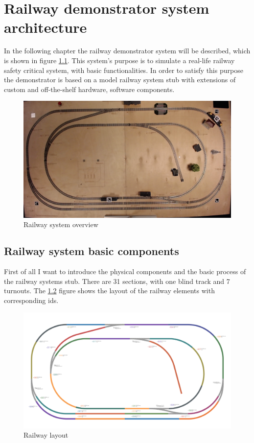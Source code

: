 
\chapter{Railway demonstrator system architecture}
In the following chapter the railway demonstrator system will be described, which is shown in figure \ref{fig:overview}. This system's purpose is to simulate a real-life railway safety critical system, with basic functionalities. In order to satisfy this purpose the demonstrator is based on a model railway system stub with extensions of custom and off-the-shelf hardware, software components. 
\begin{figure}[!ht]
	\centering
	\includegraphics[width=150mm]{figures/modes3/overview.jpg}
	\caption{Railway system overview}
	\label{fig:overview}
\end{figure}
\section{Railway system basic components}
First of all I want to introduce the physical components and the basic process of the railway systems stub. There are 31 sections, with one blind track and 7 turnouts. The \ref{fig:layout} figure shows the layout of the railway elements with corresponding ids.
\begin{figure}[!ht]
	\centering
	\includegraphics[width=150mm, keepaspectratio]{figures/modes3/layout2.png}
	\caption{Railway layout}
	\label{fig:layout}
\end{figure}
